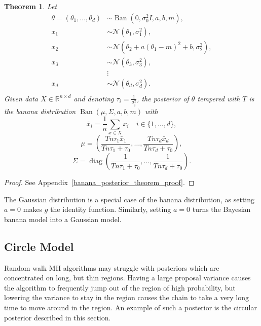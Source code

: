 \documentclass[english,twoside,openright]{HYgraduMLDS}
\newtheorem{theorem}[lemma]{Theorem}
\newcommand{\R}{\mathbb{R}}
\newcommand{\caln}{{\mathcal{N}}}
\DeclareMathOperator{\ban}{Ban}
\DeclareMathOperator{\diag}{diag}
\begin{document}
\begin{theorem}\label{banana_posterior_theorem}
    Let
    \begin{align*}
        \theta = (\theta_1,\dotsc, \theta_d) &\sim
        \ban(0, \sigma_0^2I, a, b, m), \\
        x_1 &\sim \caln(\theta_1, \sigma_1^2), \\
        x_2 &\sim \caln(\theta_2 + a(\theta_1 - m)^2 + b, \sigma_2^2),\\
        x_3 &\sim \caln(\theta_3, \sigma_3^2), \\
            &\vdots \\
        x_d &\sim \caln(\theta_d, \sigma_d^2). \\
    \end{align*}
    Given data \(X\in \R^{n\times d}\) and
    denoting \(\tau_i = \frac{1}{\sigma_i^2}\),
    the posterior of \(\theta\) tempered with \(T\) is the banana distribution
    \(\ban(\mu, \Sigma, a, b, m)\)
    with
    \[
        \bar{x}_i = \frac{1}{n}\sum_{x\in X} x_{i} \quad i\in \{1, \dotsc, d\},
    \]
    \[
        \mu = \left(\frac{Tn\tau_1\bar{x}_1}{Tn\tau_1 + \tau_0},\dotsc,
        \frac{Tn\tau_d\bar{x}_d}{Tn\tau_d + \tau_0}\right),
    \]
    \[
        \Sigma = \diag\left(
            \frac{1}{Tn\tau_1 + \tau_0},\dotsc,
            \frac{1}{Tn\tau_d + \tau_0}
        \right).
    \]
\end{theorem}
\begin{proof}
  See Appendix~\ref{banana_posterior_theorem_proof}.
\end{proof}
\setcounter{banana_posterior_theorem_number}{\value{lemma}}

The Gaussian distribution is a special case of the banana distribution,
as setting \(a = 0\) makes \(g\) the identity function. Similarly, setting
\(a = 0\) turns the Bayesian banana model into a Gaussian model.

\subsection*{Circle Model}\label{circle_section}

Random walk MH algorithms may struggle with posteriors which are concentrated
on long, but thin regions. Having a large proposal variance causes the algorithm
to frequently jump out of the region of high probability, but lowering the
variance to stay in the region causes the chain to take a very long time to move
around in the region. An example of such a posterior is the circular posterior
described in this section.
\end{document}
